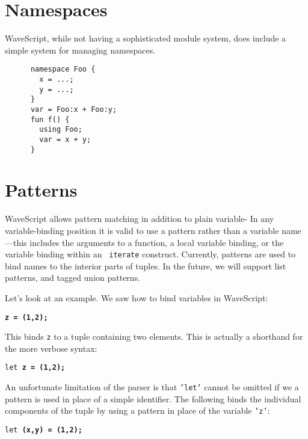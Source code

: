 \documentclass[twocolumn]{report}
\begin{document}






\section{Namespaces}

WaveScript, while not having a sophisticated module system, does
include a simple system for managing namespaces.

\begin{center}
\begin{verbatim}
      namespace Foo {
        x = ...;
        y = ...;
      }
      var = Foo:x + Foo:y;
      fun f() {
        using Foo;
        var = x + y;
      }
\end{verbatim}
\end{center}


\section{Patterns}
\label{s:patterns}

WaveScript allows pattern matching in addition to plain variable-
In any variable-binding position it is valid to use a pattern rather
than a variable name---this includes the arguments to a function, a
local variable binding, or the variable binding within an {\tt
 iterate} construct.  Currently, patterns are used to bind names
to the interior parts of tuples.  In the future, we will support list
patterns, and tagged union patterns.  

Let's look at an example.
We saw how to bind variables in WaveScript:
\begin{center}
{\tt \bf{z} = (1,2);}
\end{center}
This binds {\tt z} to a tuple containing two elements.  
This is actually a shorthand for the more verbose syntax:
\begin{center}
{\tt let \bf{z} = (1,2);}
\end{center}

An unfortunate limitation of the parser is that {\tt 'let'} cannot be
omitted if we a pattern is used in place of a simple identifier.  The
following binds the individual components of the tuple by using a
pattern in place of the variable {\tt 'z'}:
\begin{center}
{\tt let \bf{(x,y)} = (1,2);}
\end{center}
\end{document}
